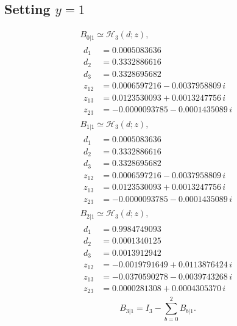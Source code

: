 \documentclass[11pt]{article}
\begin{document}
\subsection*{Setting $y=1$}
\[
\begin{gathered}
B_{0|1}\simeq\mathcal H_3(d;z),\\[3pt]
\begin{aligned}
d_1&=0.0005083636 \\
d_2&=0.3332886616 \\
d_3&=0.3328695682 \\
z_{12}&=0.0006597216-0.0037958809\,i \\
z_{13}&=0.0123530093+0.0013247756\,i \\
z_{23}&=-0.0000093785-0.0001435089\,i
\end{aligned}
\end{gathered}
\]
\[
\begin{gathered}
B_{1|1}\simeq\mathcal H_3(d;z),\\[3pt]
\begin{aligned}
d_1&=0.0005083636 \\
d_2&=0.3332886616 \\
d_3&=0.3328695682 \\
z_{12}&=0.0006597216-0.0037958809\,i \\
z_{13}&=0.0123530093+0.0013247756\,i \\
z_{23}&=-0.0000093785-0.0001435089\,i
\end{aligned}
\end{gathered}
\]
\[
\begin{gathered}
B_{2|1}\simeq\mathcal H_3(d;z),\\[3pt]
\begin{aligned}
d_1&=0.9984749093 \\
d_2&=0.0001340125 \\
d_3&=0.0013912942 \\
z_{12}&=-0.0019791649+0.0113876424\,i \\
z_{13}&=-0.0370590278-0.0039743268\,i \\
z_{23}&=0.0000281308+0.0004305370\,i
\end{aligned}
\end{gathered}
\]
\[
B_{3|1}=I_3-\sum_{b=0}^2 B_{b|1}.
\]
\end{document}
